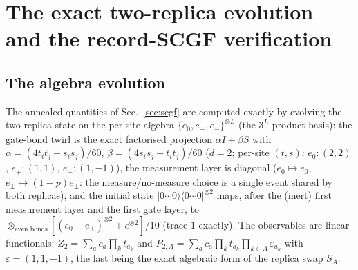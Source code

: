 \documentclass[11pt]{article}
\begin{document}
\section{The exact two-replica evolution and the record-SCGF verification}
\label{app:scgf}

\subsection{The algebra evolution}
The annealed quantities of Sec.~\ref{sec:scgf} are computed exactly by
evolving the two-replica state on the per-site algebra
$\{e_0,e_+,e_-\}^{\otimes L}$ (the $3^L$ product basis): the gate-bond
twirl is the exact factorised projection
$\alpha I+\beta S$ with
$\alpha=(4t_it_j-s_is_j)/60$, $\beta=(4s_is_j-t_it_j)/60$ ($d=2$;
per-site $(t,s)$: $e_0\colon(2,2)$, $e_+\colon(1,1)$, $e_-\colon(1,-1)$),
the measurement layer is diagonal
($e_0\mapsto e_0$, $e_\pm\mapsto(1-p)e_\pm$: the measure/no-measure choice
is a single event shared by both replicas), and the initial state
$|0\cdots0\rangle\langle0\cdots0|^{\otimes2}$ maps, after the (inert) first
measurement layer and the first gate layer, to
$\otimes_{\text{even bonds}}[(e_0+e_+)^{\otimes2}+e_-^{\otimes2}]/10$ (trace
$1$ exactly).  The observables are linear functionals:
$Z_2=\sum_a c_a\prod_k t_{a_k}$ and
$P_{2,A}=\sum_a c_a\prod_k t_{a_k}\prod_{k\in A}\varepsilon_{a_k}$ with
$\varepsilon=(1,1,-1)$, the last being the exact algebraic form of the
replica swap $S_A$.
\end{document}
